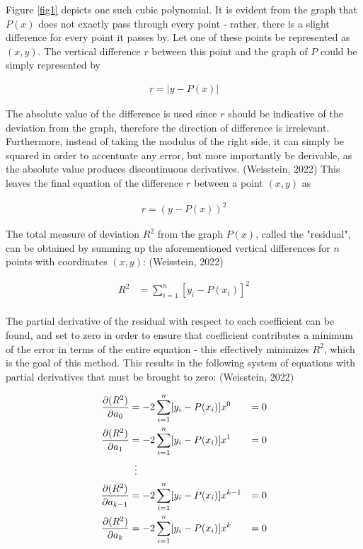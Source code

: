 \documentclass[12pt, a4paper]{article}
\begin{document}
Figure \ref{fig1} depicts one such cubic polynomial. It is evident from the
graph that $P(x)$ does not exactly pass through every point - rather, there is a
slight difference for every point it passes by. Let one of these points be
represented as $(x, y)$. The vertical difference $r$ between this point and the
graph of $P$ could be simply represented by

\begin{align*}
    r=|y-P(x)|
\end{align*}

The absolute value of the difference is used since $r$ should be indicative of
the deviation from the graph, therefore the direction of difference is
irrelevant. Furthermore, instead  of taking the modulus of the right side, it
can simply be squared in order to accentuate any error, but more importantly be
derivable, as the absolute value produces discontinuous derivatives. (Weisstein,
2022) This leaves the final equation of the difference $r$ between a point $(x,
y)$ as

\begin{align*}
    r=(y-P(x))^2
\end{align*}

The total measure of deviation $R^2$ from the graph $P(x)$, called the
"residual", can be obtained by summing up the aforementioned vertical
differences for $n$ points with coordinates $(x, y)$: (Weisstein, 2022)

\begin{align*}
    R^2 & = \sum^n_{i=1}[y_i-P(x_i)]^2 \\
\end{align*}

The partial derivative of the residual with respect to each coefficient can be
found, and set to zero in order to ensure that coefficient contributes a minimum
of the error in terms of the entire equation - this effectively minimizes $R^2$,
which is the goal of this method. This results in the following system of
equations with partial derivatives that must be brought to zero: (Weisstein, 2022)

\begin{align*}
    \pdv{(R^2)}{a_0}     & = -2 \sum^n_{i=1}[y_i-P(x_i)] x^0     & = 0 \\
    \pdv{(R^2)}{a_1}     & = -2 \sum^n_{i=1}[y_i-P(x_i)] x^1     & = 0 \\
                         & \vdotswithin{=}                             \\
    \pdv{(R^2)}{a_{k-1}} & = -2 \sum^n_{i=1}[y_i-P(x_i)] x^{k-1} & = 0 \\
    \pdv{(R^2)}{a_k}     & = -2 \sum^n_{i=1}[y_i-P(x_i)] x^k     & = 0
\end{align*}
\end{document}
